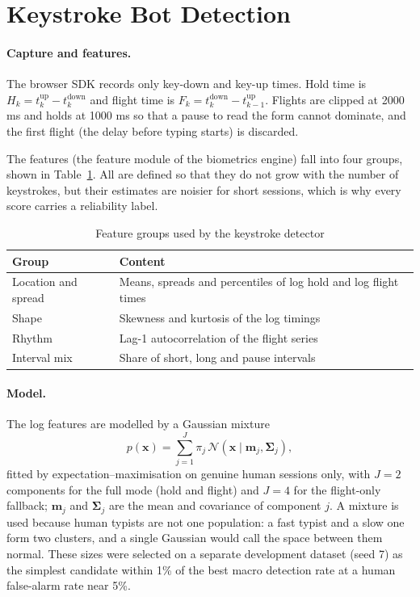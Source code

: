 \section{Keystroke Bot Detection}
\label{sec:bio}
\paragraph{Capture and features.} The browser SDK records only key-down and key-up times. Hold time is $H_k=t^{\text{up}}_k-t^{\text{down}}_k$ and flight time is $F_k=t^{\text{down}}_k-t^{\text{up}}_{k-1}$. Flights are clipped at 2000 ms and holds at 1000 ms so that a pause to read the form cannot dominate, and the first flight (the delay before typing starts) is discarded.

The features (the feature module of the biometrics engine) fall into four groups, shown in Table~\ref{tab:feat}. All are defined so that they do not grow with the number of keystrokes, but their estimates are noisier for short sessions, which is why every score carries a reliability label.

\begin{table}[htbp]
\centering
\caption{Feature groups used by the keystroke detector}
\label{tab:feat}
\small
\renewcommand{\arraystretch}{1.1}
\begin{tabularx}{\textwidth}{@{}>{\raggedright\arraybackslash}p{3.6cm}>{\raggedright\arraybackslash}X@{}}
\toprule
\textbf{Group} & \textbf{Content} \\
\midrule
Location and spread & Means, spreads and percentiles of log hold and log flight times \\
Shape & Skewness and kurtosis of the log timings \\
Rhythm & Lag-1 autocorrelation of the flight series \\
Interval mix & Share of short, long and pause intervals \\
\bottomrule
\end{tabularx}
\end{table}

\paragraph{Model.} The log features are modelled by a Gaussian mixture \cite{bishop2006prml}
\begin{equation}
p(\mathbf{x})=\sum_{j=1}^{J}\pi_j\,\mathcal{N}(\mathbf{x}\mid\mathbf{m}_j,\boldsymbol\Sigma_j),
\end{equation}
fitted by expectation--maximisation \cite{dempster1977maximum} on genuine human sessions only, with $J=2$ components for the full mode (hold and flight) and $J=4$ for the flight-only fallback; $\mathbf{m}_j$ and $\boldsymbol\Sigma_j$ are the mean and covariance of component $j$. A mixture is used because human typists are not one population: a fast typist and a slow one form two clusters, and a single Gaussian would call the space between them normal. These sizes were selected on a separate development dataset (seed 7) as the simplest candidate within 1\% of the best macro detection rate at a human false-alarm rate near 5\%.

